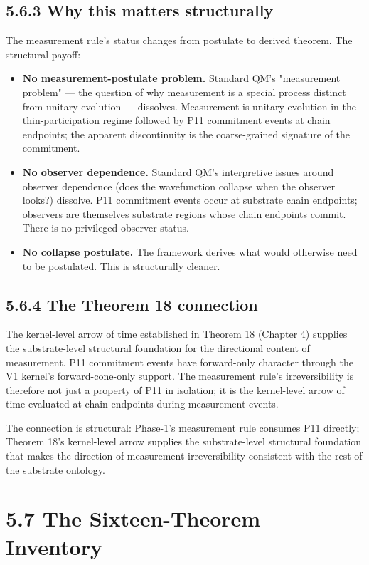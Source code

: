 \documentclass[11pt]{book}
\begin{document}
\subsection{5.6.3 Why this matters structurally}

The measurement rule's status changes from postulate to derived theorem. The structural payoff:

\begin{itemize}
\item \textbf{No measurement-postulate problem.} Standard QM's "measurement problem" — the question of why measurement is a special process distinct from unitary evolution — dissolves. Measurement is unitary evolution in the thin-participation regime followed by P11 commitment events at chain endpoints; the apparent discontinuity is the coarse-grained signature of the commitment.
\item \textbf{No observer dependence.} Standard QM's interpretive issues around observer dependence (does the wavefunction collapse when the observer looks?) dissolve. P11 commitment events occur at substrate chain endpoints; observers are themselves substrate regions whose chain endpoints commit. There is no privileged observer status.
\item \textbf{No collapse postulate.} The framework derives what would otherwise need to be postulated. This is structurally cleaner.
\end{itemize}

\subsection{5.6.4 The Theorem 18 connection}

The kernel-level arrow of time established in Theorem 18 (Chapter 4) supplies the substrate-level structural foundation for the directional content of measurement. P11 commitment events have forward-only character through the V1 kernel's forward-cone-only support. The measurement rule's irreversibility is therefore not just a property of P11 in isolation; it is the kernel-level arrow of time evaluated at chain endpoints during measurement events.

The connection is structural: Phase-1's measurement rule consumes P11 directly; Theorem 18's kernel-level arrow supplies the substrate-level structural foundation that makes the direction of measurement irreversibility consistent with the rest of the substrate ontology.

\section{5.7 The Sixteen-Theorem Inventory}
\end{document}
